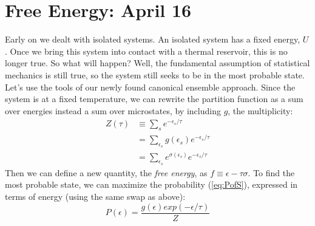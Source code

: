 \section{Free Energy: April 16}
Early on we dealt with isolated systems. An isolated system has a 
fixed energy, $U$. Once we bring this system into contact with a
thermal reservoir, this is no longer true. So what will happen?
Well, the fundamental assumption of statistical mechanics is still 
true, so the system still seeks to be in the most probable state. \\

Let's use the tools of our newly found canonical ensemble approach.
Since the system is at a fixed temperature, we can rewrite the
partition function as a sum over energies instead a sum over microstates,
by including $g$, the multiplicity:
\begin{align}
Z(\tau) &\equiv \sum_s e^{-\epsilon_s/\tau} \\
        &= \sum_{\epsilon_s} g(\epsilon_s) e^{-\epsilon_s/\tau} \\
        &= \sum_{\epsilon_s} e^{\sigma(\epsilon_s)} e^{-\epsilon_s/\tau}
\end{align}
Then we can define a new quantity, the \emph{free energy}, as
$f \equiv \epsilon - \tau \sigma$. To find the most probable state, we
can maximize the probability (\cref{eq:PofS}), expressed in terms of energy (using the
same swap as above):
\begin{equation}
P(\epsilon) = \frac{g(\epsilon) exp(-\epsilon/\tau)}{Z}
\end{equation}